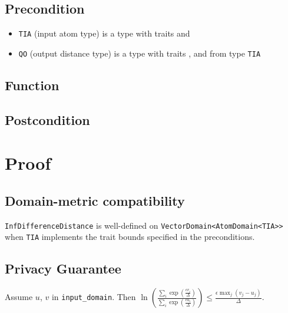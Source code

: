 \documentclass{article}
\begin{document}
\subsection*{Precondition}
\begin{itemize}
    \item \texttt{TIA} (input atom type) is a type with traits  and 

    \item \texttt{QO} (output distance type) is a type with traits , 
     and
     from type \texttt{TIA}
\end{itemize}

\subsection*{Function}
\label{sec:python-pseudocode}


\subsection*{Postcondition}


\section{Proof}
\subsection{Domain-metric compatibility} 
\texttt{InfDifferenceDistance} is well-defined on \texttt{VectorDomain<AtomDomain<TIA>>} 
when \texttt{TIA} implements the trait bounds specified in the preconditions.

\subsection{Privacy Guarantee}


\begin{lemma}
    \label{priv-inequality}
    Assume $u$, $v$ in \texttt{input\_domain}. Then
    $\ln\left(\frac{\sum_{i} \exp(\frac{\epsilon v_i}{\Delta})}{\sum_{i} \exp(\frac{\epsilon u_i}{\Delta})}\right) \le \frac{\epsilon \max_j (v_j - u_j)}{\Delta}$.
\end{lemma}
\end{document}
